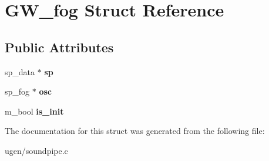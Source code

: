 \hypertarget{structGW__fog}{}\section{G\+W\+\_\+fog Struct Reference}
\label{structGW__fog}
\subsection*{Public Attributes}
\begin{DoxyCompactItemize}
\item 
\hypertarget{structGW__fog_a1b8816b6889f18470522c4ad492d5a59}{}\label{structGW__fog_a1b8816b6889f18470522c4ad492d5a59} 
sp\+\_\+data $\ast$ {\bfseries sp}
\item 
\hypertarget{structGW__fog_a1180562d752abaeb7a88dc777e15afd6}{}\label{structGW__fog_a1180562d752abaeb7a88dc777e15afd6} 
sp\+\_\+fog $\ast$ {\bfseries osc}
\item 
\hypertarget{structGW__fog_a5ce9efe7e9c86adbbdd87f7b1d5442c5}{}\label{structGW__fog_a5ce9efe7e9c86adbbdd87f7b1d5442c5} 
m\+\_\+bool {\bfseries is\+\_\+init}
\end{DoxyCompactItemize}


The documentation for this struct was generated from the following file\+:\begin{DoxyCompactItemize}
\item 
ugen/soundpipe.\+c\end{DoxyCompactItemize}
